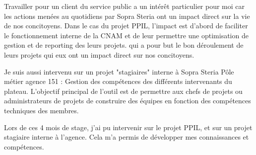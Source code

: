 Travailler pour un client du service public a un intérêt particulier pour moi car les actions menées au quotidiens par Sopra Steria ont un impact direct sur la vie de nos concitoyens.
Dans le cas du projet PPIL, l'impact est d'abord de faciliter le fonctionnement interne de la CNAM et de leur permettre une optimisation de gestion et de reporting des leurs projets. qui a pour but le bon déroulement de leurs projets qui eux ont un impact direct sur nos concitoyens.

Je suis aussi intervenu sur un projet "stagiaires" interne à Sopra Steria Pôle métier agence 151 : Gestion des compétences des différents intervenants du plateau. L'objectif principal de l'outil est de permettre aux chefs de projets ou administrateurs de projets de construire des équipes en fonction des compétences techniques des membres.

Lors de ces 4 mois de stage, j'ai pu intervenir sur le projet PPIL, et sur un projet stagiaire interne à l'agence. Cela m'a permis de développer mes connaissances et compétences.

